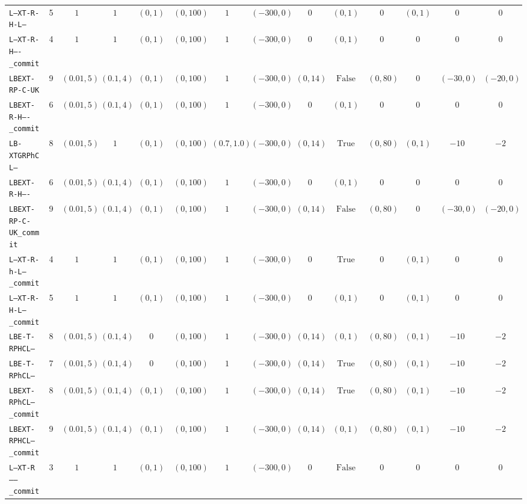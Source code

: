 {\begin{tabular}{lccccccccccccc}
\texttt{L--XT-R-H-L--} & 5 & $1$ & $1$ & $(0,1)$ & $(0,100)$ & $1$ & $(-300,0)$ & $0$ & $(0,1)$ & $0$ & $(0,1)$ & $0$ & $0$ \\
\texttt{L--XT-R-H----_commit} & 4 & $1$ & $1$ & $(0,1)$ & $(0,100)$ & $1$ & $(-300,0)$ & $0$ & $(0,1)$ & $0$ & $0$ & $0$ & $0$ \\
\texttt{LBEXT-RP-C-UK} & 9 & $(0.01,5)$ & $(0.1,4)$ & $(0,1)$ & $(0,100)$ & $1$ & $(-300,0)$ & $(0,14)$ & $\mathrm{False}$ & $(0,80)$ & $0$ & $(-30,0)$ & $(-20,0)$ \\
\texttt{LBEXT-R-H----_commit} & 6 & $(0.01,5)$ & $(0.1,4)$ & $(0,1)$ & $(0,100)$ & $1$ & $(-300,0)$ & $0$ & $(0,1)$ & $0$ & $0$ & $0$ & $0$ \\
\texttt{LB-XTGRPhCL--} & 8 & $(0.01,5)$ & $1$ & $(0,1)$ & $(0,100)$ & $(0.7,1.0)$ & $(-300,0)$ & $(0,14)$ & $\mathrm{True}$ & $(0,80)$ & $(0,1)$ & $-10$ & $-2$ \\
\texttt{LBEXT-R-H----} & 6 & $(0.01,5)$ & $(0.1,4)$ & $(0,1)$ & $(0,100)$ & $1$ & $(-300,0)$ & $0$ & $(0,1)$ & $0$ & $0$ & $0$ & $0$ \\
\texttt{LBEXT-RP-C-UK_commit} & 9 & $(0.01,5)$ & $(0.1,4)$ & $(0,1)$ & $(0,100)$ & $1$ & $(-300,0)$ & $(0,14)$ & $\mathrm{False}$ & $(0,80)$ & $0$ & $(-30,0)$ & $(-20,0)$ \\
\texttt{L--XT-R-h-L--_commit} & 4 & $1$ & $1$ & $(0,1)$ & $(0,100)$ & $1$ & $(-300,0)$ & $0$ & $\mathrm{True}$ & $0$ & $(0,1)$ & $0$ & $0$ \\
\texttt{L--XT-R-H-L--_commit} & 5 & $1$ & $1$ & $(0,1)$ & $(0,100)$ & $1$ & $(-300,0)$ & $0$ & $(0,1)$ & $0$ & $(0,1)$ & $0$ & $0$ \\
\texttt{LBE-T-RPHCL--} & 8 & $(0.01,5)$ & $(0.1,4)$ & $0$ & $(0,100)$ & $1$ & $(-300,0)$ & $(0,14)$ & $(0,1)$ & $(0,80)$ & $(0,1)$ & $-10$ & $-2$ \\
\texttt{LBE-T-RPhCL--} & 7 & $(0.01,5)$ & $(0.1,4)$ & $0$ & $(0,100)$ & $1$ & $(-300,0)$ & $(0,14)$ & $\mathrm{True}$ & $(0,80)$ & $(0,1)$ & $-10$ & $-2$ \\
\texttt{LBEXT-RPhCL--_commit} & 8 & $(0.01,5)$ & $(0.1,4)$ & $(0,1)$ & $(0,100)$ & $1$ & $(-300,0)$ & $(0,14)$ & $\mathrm{True}$ & $(0,80)$ & $(0,1)$ & $-10$ & $-2$ \\
\texttt{LBEXT-RPHCL--_commit} & 9 & $(0.01,5)$ & $(0.1,4)$ & $(0,1)$ & $(0,100)$ & $1$ & $(-300,0)$ & $(0,14)$ & $(0,1)$ & $(0,80)$ & $(0,1)$ & $-10$ & $-2$ \\
\texttt{L--XT-R------_commit} & 3 & $1$ & $1$ & $(0,1)$ & $(0,100)$ & $1$ & $(-300,0)$ & $0$ & $\mathrm{False}$ & $0$ & $0$ & $0$ & $0$ \\

\end{tabular}}
